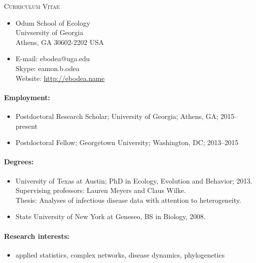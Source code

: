 \documentclass[a4paper]{article}
\begin{document}
\begin{center}
\textsc{Curriculum Vitae}
\end{center}

\begin{multicols}{2}
  \begin{itemize}
  \item[~] Odum School of Ecology\\Univsersity of Georgia\\Athens, GA 30602-2202 USA    
  \item[~] E-mail: ebodea@uga.edu\\Skype: eamon.b.odea\\Website: \url{http://ebodea.name}
\end{itemize}
\end{multicols}

\paragraph{Employment:}
\begin{itemize}
  \item[~] Postdoctoral Research Scholar; University of Georgia;
    Athens, GA; 2015--present
  \item[~] Postdoctoral Fellow; Georgetown University; Washington, DC;
    2013--2015
\end{itemize}

\paragraph{Degrees:}
\begin{itemize}
  \item[~] University of Texas at Austin; PhD in Ecology, Evolution and Behavior; 2013. \\
    Supervising professors: Lauren Meyers and Claus Wilke.\\
    Thesis: Analyses of infectious disease data with attention
    to heterogeneity.
  \item[~] State University of New York at Geneseo, BS in Biology, 2008.
\end{itemize} 

\paragraph{Research interests:}
\begin{itemize}
\item[~] applied statistics, complex networks, disease dynamics, phylogenetics
\end{itemize}
\end{document}
